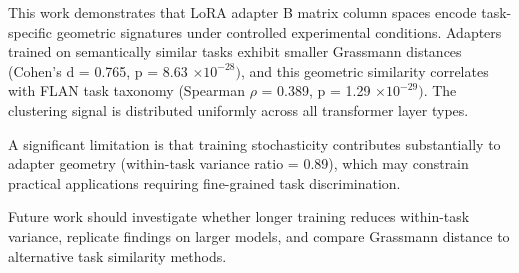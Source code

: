 
This work demonstrates that LoRA adapter B matrix column spaces encode task-specific geometric signatures under controlled experimental conditions. Adapters trained on semantically similar tasks exhibit smaller Grassmann distances (Cohen's d = 0.765, p = 8.63 $\times 10^{-28})$, and this geometric similarity correlates with FLAN task taxonomy (Spearman $\rho$ = 0.389, p = 1.29 $\times 10^{-29})$. The clustering signal is distributed uniformly across all transformer layer types.

A significant limitation is that training stochasticity contributes substantially to adapter geometry (within-task variance ratio = 0.89), which may constrain practical applications requiring fine-grained task discrimination.

Future work should investigate whether longer training reduces within-task variance, replicate findings on larger models, and compare Grassmann distance to alternative task similarity methods.
